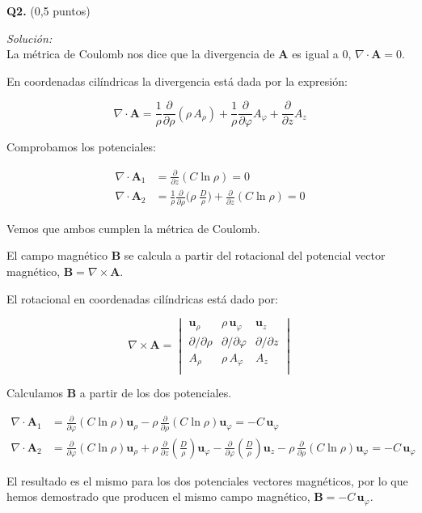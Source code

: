 \textbf{Q2.} (0,5 puntos)


\vspace{20px}
\textit{Solución:}
\\

La métrica de Coulomb nos dice que la divergencia de $\textbf{A}$ es igual a 0, $\nabla \cdot \textbf{A} = 0$.

En coordenadas cilíndricas la divergencia está dada por la expresión:

\begin{equation*}
    \nabla \cdot \textbf{A} = \frac{1}{\rho} \frac{\partial}{\partial \rho} ( \rho \, A_\rho )
    + \frac{1}{\rho} \frac{\partial}{\partial \varphi} A_{\varphi}
    + \frac{\partial}{\partial z} A_z
\end{equation*}

Comprobamos los potenciales:

\begin{align*}
    \nabla \cdot \textbf{A}_1 & = \frac{\partial}{\partial z} ( C \ln\rho) = 0 \\
    \nabla \cdot \textbf{A}_2 & = \frac{1}{\rho} \frac{\partial}{\partial \rho} \biggl( \rho \; \frac{D}{\rho} \biggr)
    + \frac{\partial}{\partial z} ( C \ln\rho) = 0
\end{align*}

Vemos que ambos cumplen la métrica de Coulomb.

El campo magnético $\textbf{B}$ se calcula a partir del rotacional del potencial vector magnético, $ \textbf{B} = \nabla \times \textbf{A}$.

El rotacional en coordenadas cilíndricas está dado por:

\begin{equation*}
    \nabla \times \textbf{A} =
    \begin{vmatrix}
        \textbf{u}_\rho         & \rho \, \textbf{u}_\varphi & \textbf{u}_z          \\[6px]
        \partial / \partial\rho & \partial / \partial\varphi & \partial / \partial z  \\[6px]
        A_\rho                  & \rho \, A_\varphi          & A_z                    \\[6px]
    \end{vmatrix}
\end{equation*}

Calculamos $\textbf{B}$ a partir de los dos potenciales.

\begin{align*}
    \nabla \cdot \textbf{A}_1 & = \frac{\partial}{\partial \varphi} ( C \ln\rho) \textbf{u}_\rho -
    \rho \, \frac{\partial}{\partial \rho} ( C \ln\rho) \textbf{u}_\varphi  = - C \, \textbf{u}_\varphi  \\
    \nabla \cdot \textbf{A}_2 & = \frac{\partial}{\partial \varphi} ( C \ln\rho) \textbf{u}_\rho +
    \rho \, \frac{\partial}{\partial z} ( \frac{D}{\rho}) \textbf{u}_\varphi  -
    \frac{\partial}{\partial \varphi} (  \frac{D}{\rho}) \textbf{u}_z -
    \rho \, \frac{\partial}{\partial \rho} ( C \ln\rho) \textbf{u}_\varphi  = - C \, \textbf{u}_\varphi
\end{align*}

El resultado es el mismo para los dos potenciales vectores magnéticos, por lo que hemos demostrado que producen el mismo campo magnético,
$\textbf{B} = - C \, \textbf{u}_\varphi$.